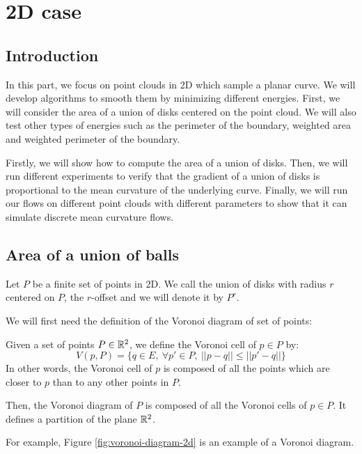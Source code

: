 \chapter{2D case}
\label{chapter:2d}

\section{Introduction}

In this part, we focus on point clouds in 2D which sample a planar curve.
We will develop algorithms to smooth them by minimizing different energies. First, we
will consider the area of a union of disks centered on the point cloud.  We will
also test other types of energies such as the perimeter of the boundary,
weighted area and weighted perimeter of the boundary.

Firstly, we will show how to compute the area of a union of disks.  Then, we
will run different experiments to verify that the gradient of a union of disks
is proportional to the mean curvature of the underlying curve. Finally, we will
run our flows on different point clouds with different parameters to show
that it can simulate discrete mean curvature flows.

\section{Area of a union of balls}

Let $ P $ be a finite set of points in 2D.  We call the union of disks with
radius $ r $ centered on $ P $, the $r$-offset and we will denote it by $ P^r $.

We will first need the definition of the Voronoi diagram of set of points:

\begin{definition}
    Given a set of points $ P \in \mathbb{R}^2 $, we define the Voronoi cell of $ p \in
    P $ by:
    $$ V(p, P) = \{ q \in E,~ \forall p' \in P,~|| p  - q || \leq || p' -
    q || \} $$
    In other words, the Voronoi cell of $ p $ is composed of all the points which are
    closer to $ p $ than to any other points in $ P $.

    Then, the Voronoi diagram of $ P $ is composed of all the Voronoi cells of $
    p \in P $. It defines a partition of the plane $ \mathbb{R}^2 $.
\end{definition}

For example, Figure \ref{fig:voronoi-diagram-2d} is an example of a Voronoi
diagram.


